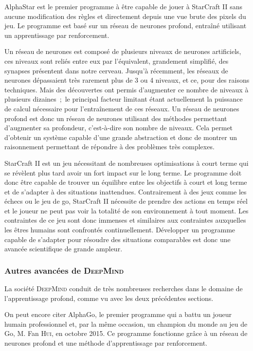 AlphaStar est le premier programme à être capable de jouer à StarCraft II sans aucune modification des règles et directement depuis une vue brute des pixels du jeu.
Le programme est basé sur un réseau de neurones profond, entraîné utilisant un apprentissage par renforcement.

Un réseau de neurones est composé de plusieurs niveaux de neurones artificiels, ces niveaux sont reliés entre eux par l'équivalent, grandement simplifié, des synapses présentent dans notre cerveau.
Jusqu'à récemment, les réseaux de neurones dépassaient très rarement plus de 3 ou 4 niveaux, et ce, pour des raisons techniques.
Mais des découvertes ont permis d'augmenter ce nombre de niveaux à plusieurs dizaines~;~le principal facteur limitant étant actuellement la puissance de calcul nécessaire pour l'entraînement de ces réseaux.
Un réseau de neurones profond est donc un réseau de neurones utilisant des méthodes permettant d'augmenter sa profondeur, c'est-à-dire son nombre de niveaux.
Cela permet d'obtenir un système capable d'une grande abstraction et donc de montrer un raisonnement permettant de répondre à des problèmes très complexes.

StarCraft II est un jeu nécessitant de nombreuses optimisations à court terme qui se révèlent plus tard avoir un fort impact sur le long terme.
Le programme doit donc être capable de trouver un équilibre entre les objectifs à court et long terme et de s'adapter à des situations inattendues.
Contrairement à des jeux comme les échecs ou le jeu de go, StarCraft II nécessite de prendre des actions en temps réel et le joueur ne peut pas voir la totalité de son environnement à tout moment.
Les contraintes de ce jeu sont donc immenses et similaires aux contraintes auxquelles les êtres humains sont confrontés continuellement.
Développer un programme capable de s'adapter pour résoudre des situations comparables est donc une avancée scientifique de grande ampleur.

\subsubsection{Autres avancées de \textsc{DeepMind}}

La société \textsc{DeepMind} conduit de très nombreuses recherches dans le domaine de l'apprentissage profond, comme vu avec les deux précédentes sections.

On peut encore citer AlphaGo, le premier programme qui a battu un joueur humain professionnel et, par la même occasion, un champion du monde au jeu de Go, M. Fan \textsc{Hui}, en octobre 2015.
Ce programme fonctionne grâce à un réseau de neurones profond et une méthode d'apprentissage par renforcement.

